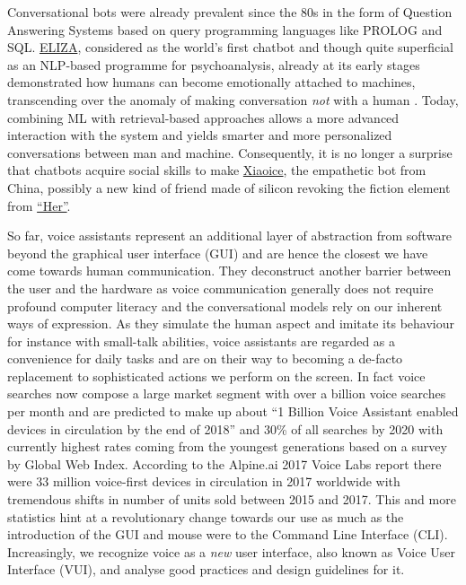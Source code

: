Conversational bots were already prevalent since the 80s in the form of Question Answering Systems based on query programming languages like PROLOG and SQL.
\href{https://en.wikipedia.org/wiki/ELIZA}{ELIZA}, considered as the world's first chatbot and though quite superficial as an NLP-based programme for psychoanalysis, already at its early stages demonstrated how humans can become emotionally attached to machines, transcending over the anomaly of making conversation \textit{not} with a human \cite{Weizenbaum1976}.
Today, combining ML with retrieval-based approaches allows a more advanced interaction with the system and yields smarter and more personalized conversations between man and machine.
Consequently, it is no longer a surprise that chatbots acquire social skills to make \href{https://en.wikipedia.org/wiki/Xiaoice}{Xiaoice}, the empathetic bot from China, possibly a new kind of friend made of silicon revoking the fiction element from \hyperlink{hermovie}{``Her''}.

So far, voice assistants represent an additional layer of abstraction from software beyond the graphical user interface (GUI) and are hence the closest we have come towards human communication.
They deconstruct another barrier between the user and the hardware as voice communication generally does not require profound computer literacy and the conversational models rely on our inherent ways of expression.
As they simulate the human aspect and imitate its behaviour for instance with small-talk abilities\cite{hiddenbrainpod}, voice assistants are regarded as a convenience for daily tasks and are on their way to becoming a de-facto replacement to sophisticated actions we perform on the screen.
In fact voice searches now compose a large market segment with over a billion voice searches per month \cite{voicelabs:trends}
and are predicted to make up about
``1 Billion Voice Assistant enabled devices in circulation by the end of 2018''\cite{voicelabs:trends} and 
30\% \cite{gartnerpreds17}\cite{searchblog}
of all searches by 2020 with currently highest rates coming from the youngest generations based on a survey\cite{globalwebindex} by Global Web Index. 
According to the Alpine.ai 2017 Voice Labs report there were 33 million voice-first devices in circulation in 2017 worldwide \cite{voicelabs} with tremendous shifts in number of units sold between 2015 and 2017.
This and more statistics hint at a revolutionary change towards our use as much as the introduction of the GUI and mouse were to the Command Line Interface (CLI).
Increasingly, we recognize voice as a \textit{new} user interface, also known as Voice User Interface (VUI), and analyse good practices and design guidelines for it.


